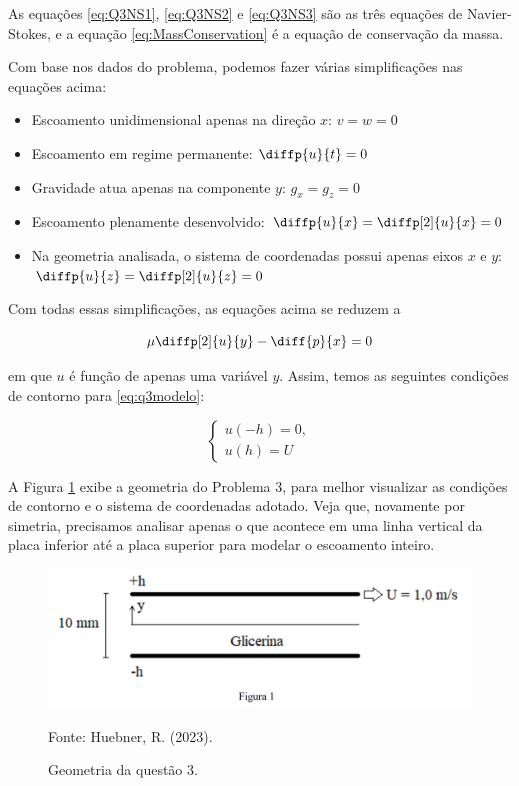 As equações \eqref{eq:Q3NS1}, \eqref{eq:Q3NS2} e \eqref{eq:Q3NS3} são as três 
equações de Navier-Stokes, e a equação \eqref{eq:MassConservation} é a equação de conservação
da massa.

Com base nos dados do problema, podemos fazer várias simplificações nas equações acima:

\begin{itemize}
    \item Escoamento unidimensional apenas na direção $x$: $v = w = 0$
    \item Escoamento em regime permanente: $\diffp{u}{t} = 0$
    \item Gravidade atua apenas na componente $y$: $g_x = g_z = 0$
    \item Escoamento plenamente desenvolvido: $\diffp{u}{x} = \diffp[2]{u}{x} = 0$
    \item Na geometria analisada, o sistema de coordenadas possui apenas eixos $x$ e $y$: 
    $\diffp{u}{z} = \diffp[2]{u}{z} = 0$ 
\end{itemize}

Com todas essas simplificações, as equações acima se reduzem a 

\begin{equation}\label{eq:q3modelo}
    \mu\diffp[2]{u}{y} - \diff{p}{x} = 0
\end{equation}

\noindent em que $u$ é função de apenas uma variável $y$.
Assim, temos as seguintes condições de contorno para \eqref{eq:q3modelo}:

\begin{equation}\label{eq:q3modeloContorno}
    \begin{cases}
        u(-h) = 0, \\
        u(h) = U
    \end{cases}
\end{equation}

A Figura \ref*{fig:geometriaQ3} exibe a geometria do Problema 3, para melhor visualizar as 
condições de contorno e o sistema de coordenadas adotado. Veja que, novamente por simetria,
precisamos analisar apenas o que acontece em uma linha vertical da placa inferior até a placa
superior para modelar o escoamento inteiro.

\begin{figure}[h!]
    \caption{Geometria da questão 3.}
    \label{fig:geometriaQ3}
    \centering
    \centerline{\includegraphics[scale=0.3]{geometriaQ3.png}}
    \par{Fonte: Huebner, R. (2023).}
\end{figure}

